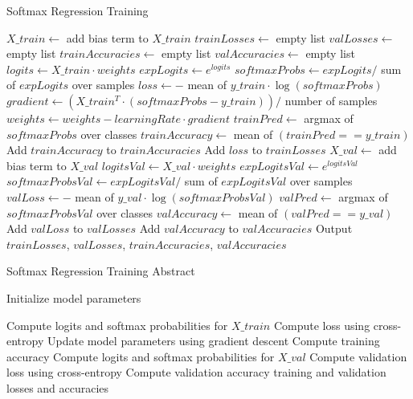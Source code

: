 \documentclass{article}
\begin{document}
\begin{algorithm}
\caption{Softmax Regression Training}
\begin{algorithmic}[1]

    \State $X\_train \gets$ add bias term to $X\_train$
    \State $trainLosses \gets$ empty list
    \State $valLosses \gets$ empty list
    \State $trainAccuracies \gets$ empty list
    \State $valAccuracies \gets$ empty list
        \State $logits \gets X\_train \cdot weights$
        \State $expLogits \gets e^{logits}$
        \State $softmaxProbs \gets expLogits /$ sum of $expLogits$ over samples
        \State $loss \gets -$ mean of $y\_train \cdot \log(softmaxProbs)$
        \State $gradient \gets (X\_train^T \cdot (softmaxProbs - y\_train)) /$ number of samples
        \State $weights \gets weights - learningRate \cdot gradient$
        \State $trainPred \gets$ argmax of $softmaxProbs$ over classes
        \State $trainAccuracy \gets$ mean of $(trainPred == y\_train)$
        \State Add $trainAccuracy$ to $trainAccuracies$
        \State Add $loss$ to $trainLosses$
            \State $X\_val \gets$ add bias term to $X\_val$
            \State $logitsVal \gets X\_val \cdot weights$
            \State $expLogitsVal \gets e^{logitsVal}$
            \State $softmaxProbsVal \gets expLogitsVal /$ sum of $expLogitsVal$ over samples
            \State $valLoss \gets -$ mean of $y\_val \cdot \log(softmaxProbsVal)$
            \State $valPred \gets$ argmax of $softmaxProbsVal$ over classes
            \State $valAccuracy \gets$ mean of $(valPred == y\_val)$
            \State Add $valLoss$ to $valLosses$
            \State Add $valAccuracy$ to $valAccuracies$
        \EndIf
    \EndFor
    \State Output $trainLosses$, $valLosses$, $trainAccuracies$, $valAccuracies$
\EndProcedure
\end{algorithmic}
\end{algorithm}


\begin{algorithm}
\caption{Softmax Regression Training Abstract}
\begin{algorithmic}[1]
    \State Initialize model parameters
\EndProcedure

        \State Compute logits and softmax probabilities for $X\_train$
        \State Compute loss using cross-entropy
        \State Update model parameters using gradient descent
        \State Compute training accuracy
            \State Compute logits and softmax probabilities for $X\_val$
            \State Compute validation loss using cross-entropy
            \State Compute validation accuracy
        \EndIf
    \EndFor
    \State \Return training and validation losses and accuracies
\EndProcedure
\end{algorithmic}
\end{algorithm}
\end{document}
